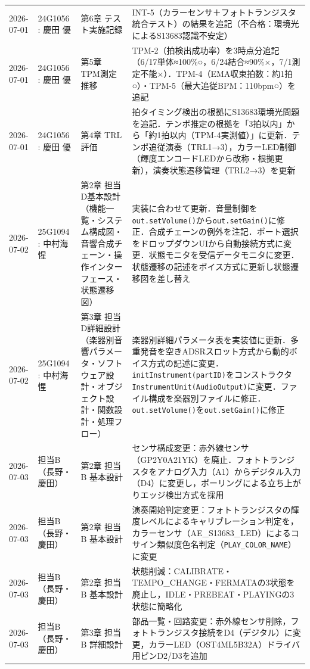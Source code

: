 \begin{longtable}{p{2.2cm}p{3.5cm}p{4cm}p{5.5cm}}
2026-07-01 & 24G1056 : 慶田 優 & 第6章 テスト実施記録 & INT-5（カラーセンサ＋フォトトランジスタ統合テスト）の結果を追記（不合格：環境光によるS13683認識不安定） \\
2026-07-01 & 24G1056 : 慶田 優 & 第5章 TPM測定推移 & TPM-2（拍検出成功率）を3時点分追記（6/17単体≈100\%○，6/24結合≈90\%×，7/1測定不能×）．TPM-4（EMA収束拍数：約1拍○）・TPM-5（最大追従BPM：110bpm○）を追記 \\
2026-07-01 & 24G1056 : 慶田 優 & 第4章 TRL評価 & 拍タイミング検出の根拠にS13683環境光問題を追記．テンポ推定の根拠を「3拍以内」から「約1拍以内（TPM-4実測値）」に更新．テンポ追従演奏（TRL1→3），カラーLED制御（輝度エンコードLEDから改称・根拠更新），演奏状態遷移管理（TRL2→3）を更新 \\
2026-07-02 & 25G1094 : 中村海惺 & 第2章 担当D基本設計（機能一覧・システム構成図・音響合成チェーン・操作インターフェース・状態遷移図） & 実装に合わせて更新．音量制御を\texttt{out.setVolume()}から\texttt{out.setGain()}に修正．合成チェーンの例外を注記．ポート選択をドロップダウンUIから自動接続方式に変更．状態モニタを受信データモニタに変更．状態遷移の記述をボイス方式に更新し状態遷移図を差し替え \\
2026-07-02 & 25G1094 : 中村海惺 & 第3章 担当D詳細設計（楽器別音響パラメータ・ソフトウェア設計・オブジェクト設計・関数設計・処理フロー） & 楽器別詳細パラメータ表を実装値に更新．多重発音を空きADSRスロット方式から動的ボイス方式の記述に変更．\texttt{initInstrument(partID)}をコンストラクタ\texttt{InstrumentUnit(AudioOutput)}に変更．ファイル構成を楽器別ファイルに修正．\texttt{out.setVolume()}を\texttt{out.setGain()}に修正 \\
2026-07-03 & 担当B（長野・慶田） & 第2章 担当B 基本設計 & センサ構成変更：赤外線センサ（GP2Y0A21YK）を廃止．フォトトランジスタをアナログ入力（A1）からデジタル入力（D4）に変更し，ポーリングによる立ち上がりエッジ検出方式を採用 \\
2026-07-03 & 担当B（長野・慶田） & 第2章 担当B 基本設計 & 演奏開始判定変更：フォトトランジスタの輝度レベルによるキャリブレーション判定を，カラーセンサ（AE\_S13683\_LED）によるコサイン類似度色名判定（\texttt{PLAY\_COLOR\_NAME}）に変更 \\
2026-07-03 & 担当B（長野・慶田） & 第2章 担当B 基本設計 & 状態削減：CALIBRATE・TEMPO\_CHANGE・FERMATAの3状態を廃止し，IDLE・PREBEAT・PLAYINGの3状態に簡略化 \\
2026-07-03 & 担当B（長野・慶田） & 第3章 担当B 詳細設計 & 部品一覧・回路変更：赤外線センサ削除，フォトトランジスタ接続をD4（デジタル）に変更，カラーLED（OST4ML5B32A）ドライバ用ピンD2/D3を追加 \\

\end{longtable}

